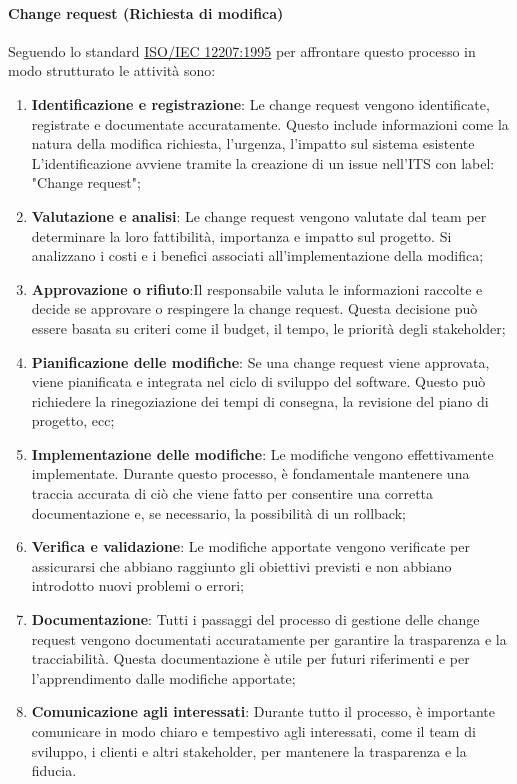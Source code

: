 \paragraph{Change request (Richiesta di modifica)}
Seguendo lo standard \href{https://www.math.unipd.it/~tullio/IS-1/2009/Approfondimenti/ISO_12207-1995.pdf}{ISO/IEC 12207:1995} per affrontare questo processo in modo strutturato le attività sono:
\begin{enumerate}
    \item \textbf{Identificazione e registrazione}: Le change request vengono identificate, registrate e documentate accuratamente. Questo include informazioni come la natura della modifica richiesta, l'urgenza, l'impatto sul sistema esistente\\
          L'identificazione avviene tramite la creazione di un issue nell'ITS con label: "Change request";
    \item \textbf{Valutazione e analisi}: Le change request vengono valutate dal team per determinare la loro fattibilità, importanza e impatto sul progetto. Si analizzano i costi e i benefici associati all'implementazione della modifica;
    \item \textbf{Approvazione o rifiuto}:Il responsabile valuta le informazioni raccolte e decide se approvare o respingere la change request. Questa decisione può essere basata su criteri come il budget, il tempo, le priorità degli stakeholder;
    \item \textbf{Pianificazione delle modifiche}: Se una change request viene approvata, viene pianificata e integrata nel ciclo di sviluppo del software. Questo può richiedere la rinegoziazione dei tempi di consegna, la revisione del piano di progetto, ecc;
    \item \textbf{Implementazione delle modifiche}: Le modifiche vengono effettivamente implementate. Durante questo processo, è fondamentale mantenere una traccia accurata di ciò che viene fatto per consentire una corretta documentazione e, se necessario, la possibilità di un rollback;
    \item \textbf{Verifica e validazione}: Le modifiche apportate vengono verificate per assicurarsi che abbiano raggiunto gli obiettivi previsti e non abbiano introdotto nuovi problemi o errori;
    \item \textbf{Documentazione}: Tutti i passaggi del processo di gestione delle change request vengono documentati accuratamente per garantire la trasparenza e la tracciabilità. Questa documentazione è utile per futuri riferimenti e per l'apprendimento dalle modifiche apportate;
    \item \textbf{Comunicazione agli interessati}: Durante tutto il processo, è importante comunicare in modo chiaro e tempestivo agli interessati, come il team di sviluppo, i clienti e altri stakeholder, per mantenere la trasparenza e la fiducia.
\end{enumerate}

